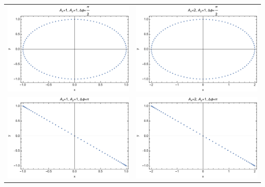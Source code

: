 \documentclass{article}
\begin{document}
\begin{tabular}{ll}
    \includegraphics[width=3in]{homework1/plot_1,1,pi2.pdf} & \includegraphics[width=3in]{homework1/plot_2,1,pi2.pdf} \\
    \includegraphics[width=3in]{homework1/plot_1,1,pi.pdf} & \includegraphics[width=3in]{homework1/plot_2,1,pi.pdf}
\end{tabular}

\newpage

\medskip
\end{document}
